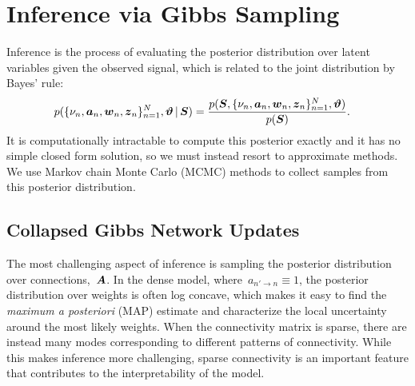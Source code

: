 \section{Inference via Gibbs Sampling}
Inference is the process of evaluating the posterior distribution over
latent variables given the observed signal, which is related to the
joint distribution by Bayes' rule:
\begin{align*}
p(\{\nu_n, \boldsymbol{a}_n, \boldsymbol{w}_n, \boldsymbol{z}_n\}_{n=1}^N, \boldsymbol{\vartheta} \,|\, \boldsymbol{S})  
  &= \frac{p(\boldsymbol{S}, \{\nu_n, \boldsymbol{a}_n, \boldsymbol{w}_n, \boldsymbol{z}_n\}_{n=1}^N, \boldsymbol{\vartheta}) }{p(\boldsymbol{S})}.
\end{align*}
It is computationally intractable to compute this posterior exactly
and it has no simple closed form solution, so we must instead resort
to approximate methods.  We use Markov chain Monte Carlo (MCMC)
methods to collect samples from this posterior distribution.

\subsection{Collapsed Gibbs Network Updates}
The most challenging aspect of inference is sampling the posterior
distribution over connections,~$\boldsymbol{A}$. In the dense model, where~$a_{n'
  \to n} \equiv 1$, the posterior distribution over weights is often
log concave, which makes it easy to find the \emph{maximum a
  posteriori} (MAP) estimate and characterize the local uncertainty
around the most likely weights.  When the connectivity matrix is
sparse, there are instead many modes corresponding to different
patterns of connectivity. While this makes inference more challenging,
sparse connectivity is an important feature that contributes to the
interpretability of the model.

